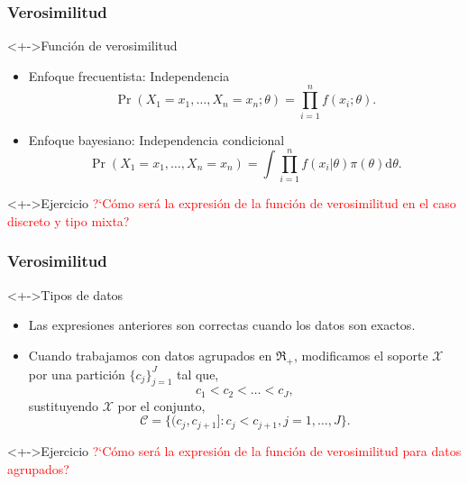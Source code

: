 \documentclass[cjk,t,compress]{beamer}
\newcommand{\dd}{\mathrm{d}}
\begin{document}
	\frame
	{
    \frametitle{Verosimilitud}
  		{\scriptsize  	
		
		\begin{block}<+->{Funci\'on de verosimilitud}
	  	{
	  	\begin{itemize}
	  		\item Enfoque frecuentista: Independencia
	  		\begin{equation}
	  		 \Pr(X_1=x_1,\ldots,X_n=x_n;\theta) = \prod_{i=1}^{n} f(x_i;\theta).
	  		\end{equation}
	  		\item Enfoque bayesiano: Independencia condicional 
	  		\begin{equation}
	  		 \Pr(X_1=x_1,\ldots,X_n=x_n) = \int \prod_{i=1}^{n} f(x_i|\theta) \pi(\theta) \dd \theta.
	  		\end{equation}
	  	\end{itemize}
	  	}
 		\end{block}  		

	  	\vspace{0.3cm}
		\begin{block}<+->{Ejercicio}
	  	{
	  	\textcolor{red}{?`C\'omo ser\'a la expresi\'on de la funci\'on de verosimilitud en el caso discreto y tipo mixta?}
	  	}
 		\end{block}  		
		}
	}

	\frame
	{
    \frametitle{Verosimilitud}
  		{\scriptsize  	
		
		\begin{block}<+->{Tipos de datos}
	  	{
	  	\begin{itemize}
	  		\item Las expresiones anteriores son correctas cuando los datos son exactos. 
	  		\item Cuando trabajamos con datos agrupados en $\Re_+$, modificamos el soporte $\mathcal{X}$ por una partici\'on $\{c_j\}_{j=1}^{J}$ tal que, 
	  		\begin{equation}
	  			c_1 < c_2 < \ldots <c_J,
	  		\end{equation}
	  		sustituyendo $\mathcal{X}$ por el conjunto,
	  		\begin{equation}
	  			\mathcal{C}=\{ (c_{j},c_{j+1}]: c_j < c_{j+1}, j=1,\ldots,J\}.
	  		\end{equation}
	  		
	  	\end{itemize}
	  	}
 		\end{block}  		

	  	\vspace{0.3cm}
		\begin{block}<+->{Ejercicio}
	  	{
	  	\textcolor{red}{?`C\'omo ser\'a la expresi\'on de la funci\'on de verosimilitud para datos agrupados?}
	  	}
 		\end{block}  		

		}
	}
\end{document}
